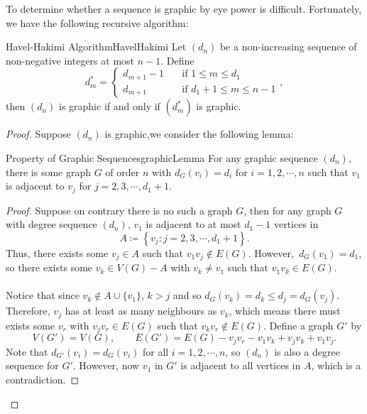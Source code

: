 \documentclass[math]{amznotes}
\theoremstyle{remark}
\begin{document}
To determine whether a sequence is graphic by eye power is difficult. Fortunately, we have the following recursive algorithm:
\begin{thmbox}{Havel-Hakimi Algorithm}{HavelHakimi}
    Let $(d_n)$ be a non-increasing sequence of non-negative integers at most $n - 1$. Define
    \begin{equation*}
        d^*_m = \begin{cases}
            d_{m + 1} - 1 & \quad\textrm{if } 1 \leq m \leq d_1 \\
            d_{m + 1} & \quad\textrm{if } d_1 + 1 \leq m \leq n - 1
        \end{cases},
    \end{equation*}
    then $(d_n)$ is graphic if and only if $\left(d^*_m\right)$ is graphic.
    \tcblower
    \begin{proof}
        Suppose $(d_n)$ is graphic,we consider the following lemma:
        \begin{lembox}{Property of Graphic Sequences}{graphicLemma}
            For any graphic sequence $(d_n)$, there is some graph $G$ of order $n$ with $d_G(v_i) = d_i$ for $i = 1, 2, \cdots, n$ such that $v_1$ is adjacent to $v_j$ for $j = 2, 3, \cdots, d_1 + 1$.
            \tcblower
            \begin{proof}
                Suppose on contrary there is no such a graph $G$, then for any graph $G$ with degree sequence $(d_n)$, $v_1$ is adjacent to at most $d_1 - 1$ vertices in
                \begin{equation*}
                    A \coloneqq \left\{v_j \colon j = 2, 3, \cdots, d_1 + 1\right\}.
                \end{equation*}
                Thus, there exists some $v_j \in A$ such that $v_1v_j \notin E(G)$. However,~$d_G(v_1) = d_1$, so there exists some $v_k \in V(G) - A$ with $v_k \neq v_1$ such that $v_1v_k \in E(G)$.
                \\\\
                Notice that since $v_k \notin A \cup \{v_1\}$, $k > j$ and so $d_G(v_k) = d_k \leq d_j = d_G(v_j)$. Therefore, $v_j$ has at least as many neighbours as $v_k$, which means there must exists some $v_r$ with $v_jv_r \in E(G)$ such that $v_kv_r \notin E(G)$. Define a graph $G'$ by
                \begin{equation*}
                    V(G') = V(G), \qquad E(G') = E(G) - v_jv_r - v_1v_k + v_jv_k + v_1v_j.
                \end{equation*}
                Note that $d_{G'}(v_i) = d_G(v_i)$ for all $i = 1, 2, \cdots, n$, so $(d_n)$ is also a degree sequence for $G'$. However, now $v_1$ in $G'$ is adjacent to all vertices in $A$, which is a contradiction.

\end{proof}
\end{lembox}
\end{proof}
\end{thmbox}
\end{document}
